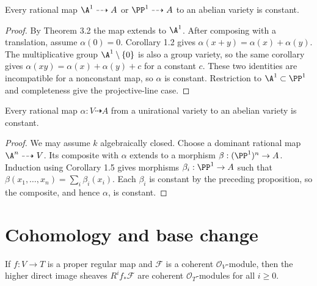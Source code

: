 \begin{proposition}
\label{prop:milne-no-rational-curves}

Every rational map $\A^1\dashrightarrow A$ or $\PP^1\dashrightarrow A$ to an
abelian variety is constant.
\end{proposition}

\begin{proof}
By Theorem 3.2 the map extends to $\A^1$.  After composing with a translation,
assume $\alpha(0)=0$.  Corollary 1.2 gives
$\alpha(x+y)=\alpha(x)+\alpha(y)$.  The multiplicative group
$\A^1\setminus\{0\}$ is also a group variety, so the same corollary gives
$\alpha(xy)=\alpha(x)+\alpha(y)+c$ for a constant $c$.  These two identities
are incompatible for a nonconstant map, so $\alpha$ is constant.  Restriction
to $\A^1\subset\PP^1$ and completeness give the projective-line case.
\end{proof}

\begin{proposition}
\label{prop:milne-unirational-to-abelian}

Every rational map $\alpha:V\dashrightarrow A$ from a unirational variety to
an abelian variety is constant.
\end{proposition}

\begin{proof}
We may assume $k$ algebraically closed.  Choose a dominant rational map
$\A^n\dashrightarrow V$.  Its composite with $\alpha$ extends to a morphism
$\beta:(\PP^1)^n\to A$.  Induction using Corollary 1.5 gives morphisms
$\beta_i:\PP^1\to A$ such that
$\beta(x_1,\ldots,x_n)=\sum_i\beta_i(x_i)$.  Each $\beta_i$ is constant by
the preceding proposition, so the composite, and hence $\alpha$, is constant.
\end{proof}

\section{Cohomology and base change}

\begin{theorem}
\label{thm:milne-cohomology-coherence}

If $f:V\to T$ is a proper regular map and $\mathcal F$ is a coherent
$\mathcal O_V$-module, then the higher direct image sheaves
$R^if_*\mathcal F$ are coherent $\mathcal O_T$-modules for all $i\ge0$.
\end{theorem}

